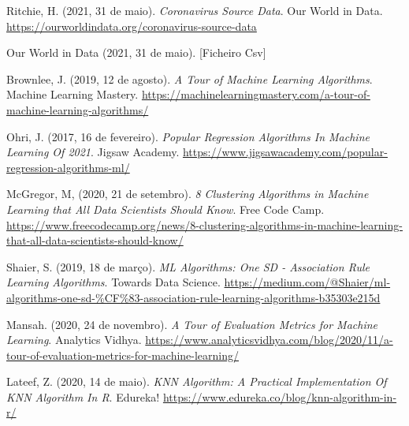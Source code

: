 \documentclass[conference]{IEEEtran}
\begin{document}
\begin{thebibliography}{00}

 Ritchie, H. (2021, 31 de maio). \textit{Coronavirus Source Data}. Our World in Data. \url{https://ourworldindata.org/coronavirus-source-data}

 Our World in Data (2021, 31 de maio). [Ficheiro Csv]

 Brownlee, J. (2019, 12 de agosto). \textit{A Tour of Machine Learning Algorithms}. Machine Learning Mastery. \url{https://machinelearningmastery.com/a-tour-of-machine-learning-algorithms/}

 Ohri, J. (2017, 16 de fevereiro). \textit{Popular Regression Algorithms In Machine Learning Of 2021}. Jigsaw Academy. \url{https://www.jigsawacademy.com/popular-regression-algorithms-ml/}

 McGregor, M, (2020, 21 de setembro). \textit{8 Clustering Algorithms in Machine Learning that All Data Scientists Should Know}. Free Code Camp. \url{https://www.freecodecamp.org/news/8-clustering-algorithms-in-machine-learning-that-all-data-scientists-should-know/ }

 Shaier, S. (2019, 18 de março). \textit{ML Algorithms: One SD - Association Rule Learning Algorithms}. Towards Data Science. \url{https://medium.com/@Shaier/ml-algorithms-one-sd-\%CF\%83-association-rule-learning-algorithms-b35303e215d}

 Mansah. (2020, 24 de novembro). \textit{A Tour of Evaluation Metrics for Machine Learning}. Analytics Vidhya. \url{https://www.analyticsvidhya.com/blog/2020/11/a-tour-of-evaluation-metrics-for-machine-learning/}

 Lateef, Z. (2020, 14 de maio). \textit{KNN Algorithm: A Practical Implementation Of KNN Algorithm In R}. Edureka! \url{https://www.edureka.co/blog/knn-algorithm-in-r/}

\end{thebibliography}
\end{document}
